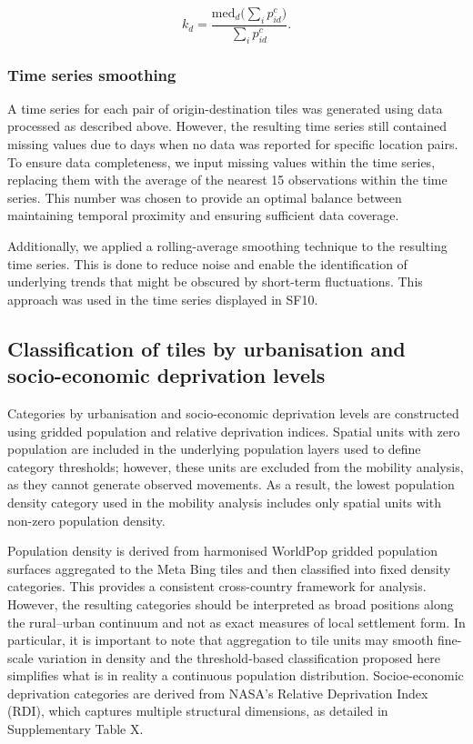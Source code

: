 \documentclass[fleqn,10pt]{wlscirep}
\begin{document}
\begin{equation}
k_d = \dfrac{\mbox{med}_d\big(\sum_i{p^c_{id}}\big)}{\sum_i{p^c_{id}}}.
\end{equation}

\subsubsection*{Time series smoothing}

A time series for each pair of origin-destination tiles was generated using data processed as described above. However, the resulting time series still contained missing values due to days when no data was reported for specific location pairs. To ensure data completeness, we input missing values within the time series, replacing them with the average of the nearest 15 observations within the time series. This number was chosen to provide an optimal balance between maintaining temporal proximity and ensuring sufficient data coverage.

Additionally, we applied a rolling-average smoothing technique to the resulting time series. This is done to reduce noise and enable the identification of underlying trends that might be obscured by short-term fluctuations. This approach was used in the time series displayed in SF10.

\subsection*{Classification of tiles by urbanisation and socio-economic deprivation levels}

Categories by urbanisation and socio-economic deprivation levels are constructed using gridded population and relative deprivation indices. Spatial units with zero population are included in the underlying population layers used to define category thresholds; however, these units are excluded from the mobility analysis, as they cannot generate observed movements. As a result, the lowest population density category used in the mobility analysis includes only spatial units with non-zero population density.

Population density is derived from harmonised WorldPop gridded population surfaces aggregated to the Meta Bing tiles and then classified into fixed density categories. This provides a consistent cross-country framework for analysis. However, the resulting categories should be interpreted as broad positions along the rural–urban continuum and not as exact measures of local settlement form. In particular, it is important to note that aggregation to tile units may smooth fine-scale variation in density and the threshold-based classification proposed here simplifies what is in reality a continuous population distribution. Socioe-economic deprivation categories are derived from NASA's Relative Deprivation Index (RDI), which captures multiple structural dimensions, as detailed in Supplementary Table X.
\end{document}
